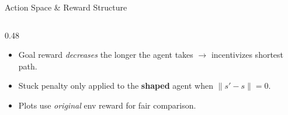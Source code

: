 \documentclass[11pt,aspectratio=169]{beamer}
\begin{document}
\begin{frame}{Action Space \& Reward Structure}
\begin{columns}
\begin{column}{0.48\textwidth}
        \vspace{0.1cm}
        \small
        \begin{itemize}
            \item Goal reward \textit{decreases} the longer the agent takes $\to$ incentivizes shortest path.
            \item Stuck penalty only applied to the \textbf{shaped} agent when $\|s' - s\| = 0$.
            \item Plots use \textit{original} env reward for fair comparison.
        \end{itemize}
    \end{column}
    \end{columns}
\end{frame}

\end{document}

